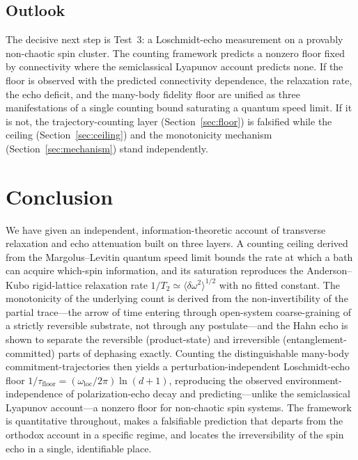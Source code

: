 \documentclass[twocolumn,10pt,a4paper]{article}
\theoremstyle{thmstyle}
\theoremstyle{definition}
\theoremstyle{remark}
\newcommand{\Ttwo}{T_{2}}
\begin{document}
\subsection{Outlook}

The decisive next step is Test~3: a Loschmidt-echo measurement on a
provably non-chaotic spin cluster. The counting framework predicts a
nonzero floor fixed by connectivity where the semiclassical Lyapunov
account predicts none. If the floor is observed with the predicted
connectivity dependence, the relaxation rate, the echo deficit, and the
many-body fidelity floor are unified as three manifestations of a single
counting bound saturating a quantum speed limit. If it is not, the
trajectory-counting layer (Section~\ref{sec:floor}) is falsified while the
ceiling (Section~\ref{sec:ceiling}) and the monotonicity mechanism
(Section~\ref{sec:mechanism}) stand independently.

\section{Conclusion}
\label{sec:conclusion}

We have given an independent, information-theoretic account of transverse
relaxation and echo attenuation built on three layers. A counting ceiling
derived from the Margolus--Levitin quantum speed limit bounds the rate at
which a bath can acquire which-spin information, and its saturation
reproduces the Anderson--Kubo rigid-lattice relaxation rate
$1/\Ttwo\simeq\langle\delta\omega^{2}\rangle^{1/2}$ with no fitted constant.
The monotonicity of the underlying count is derived from the
non-invertibility of the partial trace---the arrow of time entering through
open-system coarse-graining of a strictly reversible substrate, not through
any postulate---and the Hahn echo is shown to separate the reversible
(product-state) and irreversible (entanglement-committed) parts of dephasing
exactly. Counting the distinguishable many-body commitment-trajectories then
yields a perturbation-independent Loschmidt-echo floor
$1/\tau_{\mathrm{floor}}=(\omega_{\mathrm{loc}}/2\pi)\ln(d+1)$, reproducing
the observed environment-independence of polarization-echo decay and
predicting---unlike the semiclassical Lyapunov account---a nonzero floor for
non-chaotic spin systems. The framework is quantitative throughout, makes a
falsifiable prediction that departs from the orthodox account in a specific
regime, and locates the irreversibility of the spin echo in a single,
identifiable place.



\end{document}
